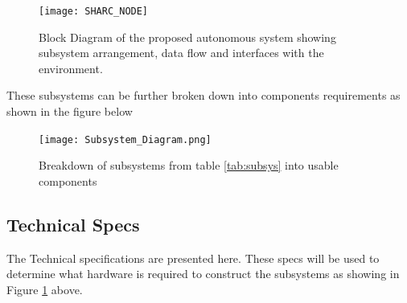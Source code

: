 \begin{figure}[H]
    \centering
    \texttt{[image: SHARC\_NODE]}
    \caption{Block Diagram of the proposed autonomous system showing subsystem arrangement, data flow and interfaces with the environment.}
    \label{mbuoy}
\end{figure}

These subsystems can be further broken down into components requirements as shown in the figure below

\begin{figure}[H]
    \centering
    \texttt{[image: Subsystem\_Diagram.png]}
    \caption{Breakdown of subsystems from table \ref{tab:subsys} into usable components}
    \label{fig:ss_breakdown}
\end{figure}



\subsection{Technical Specs}

The Technical specifications are presented here. These specs will be used to determine what hardware is required to construct the subsystems as showing in Figure \ref{mbuoy} above.


